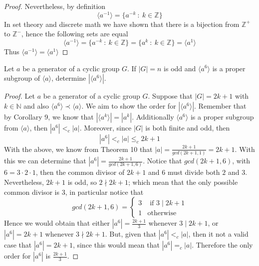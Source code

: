 \begin{assignment}[
  header=HeaderA,
  body=BodyA,
  title={Homework 2},
  duedate={17-February-2026},
  toc=false,
  toctitle={This appears on the Table of contents.},
  exlist=false
]
\begin{exer}[Problem 4.11]
\begin{proof}
Nevertheless, by definition
\[
\langle a^{-1} \rangle = \{a^{-k} \ : \ k \in \mathbb{Z} \}
\]
In set theory and discrete math we have shown that there is a bijection from $\mathbb{Z}^+$ to $\mathbb{Z}^-$, hence the following sets are equal
\[
\langle a^{-1} \rangle = \{a^{-k} \ : \ k \in \mathbb{Z} \} = \{a^{k} \ : \ k \in \mathbb{Z} \} = \langle a^1 \rangle
\]
Thus $\langle a^{-1} \rangle = \langle a^1 \rangle$

\end{proof}    
\end{exer}

\begin{exer}[Problem 4.17]
Let $a$ be a generator of a cyclic group $G$. If $|G| = n$ is odd and $\langle a^6\rangle$ is a proper subgroup of $\langle a \rangle$, determine $|\langle a^6\rangle|$.    
\begin{proof}
Let $a$ be a generator of a cyclic group $G$. Suppose that $|G| = 2k + 1$ with $k \in \mathbb{N}$ and also $\langle a^6 \rangle \prec \langle a \rangle$. We aim to show the order for $|\langle a^6 \rangle|$. Remember that by Corollary 9, we know that $|\langle a^k\rangle| = |a^k|$. Additionally $\langle a^6\rangle$ is a proper subgroup from $\langle a\rangle$, then $| a^6 | <_c | a |$. Moreover, since $|G|$ is both finite and odd, then $$| a^6 | <_c | a | \leq_c 2k +1$$
With the above, we know from Theorem 10 that $|a| = \frac{2k+1}{gcd(2k+1, 1)} = 2k + 1$. With this we can determine that $|a^6| = \frac{2k + 1}{gcd(2k+1, 6)}$. Notice that $gcd(2k+1,6)$, with $6 = 3 \cdot 2 \cdot 1$, then the common divisor of $2k +1$ and $6$ must divide both $2$ and $3$. Nevertheless, $2k+1$ is odd, so $2 \nmid 2k+1$; which mean that the only possible common divisor is 3, in particular notice that
$$gcd(2k+1, 6) =\begin{cases}
    3 & \text{ if } 3\mid2k+1\\
    1 & \text{otherwise}
\end{cases}  $$
Hence we would obtain that either $|a^6| = \frac{2k+1}{3}$ whenever $3\mid 2k+1$, or $|a^6| = 2k+1$ whenever $3\nmid 2k+1$. But, given that $| a^6 | <_c |a|$, then it not a valid case that $| a^6| = 2k+1$, since this would mean that $| a^6| =_c |a|$. Therefore the only order for $|a^6|$ is $\frac{2k+1}{3}$.   
\end{proof}
\end{exer}


\end{assignment}
